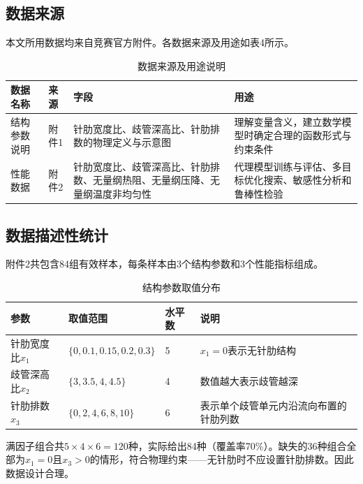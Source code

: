 \documentclass[12pt,a4paper]{ctexart}
\begin{document}
\subsection{数据来源}

本文所用数据均来自竞赛官方附件。各数据来源及用途如表4所示。

\begin{table}[H]
\centering
\caption{数据来源及用途说明}
\footnotesize
\begin{tabular}{p{}p{}p{}p{}}
\toprule
数据名称 & 来源 & 字段 & 用途 \\
\midrule
结构参数说明 & 附件1 & 针肋宽度比、歧管深高比、针肋排数的物理定义与示意图 & 理解变量含义，建立数学模型时确定合理的函数形式与约束条件 \\
\addlinespace
性能数据 & 附件2 & 针肋宽度比、歧管深高比、针肋排数、无量纲热阻、无量纲压降、无量纲温度非均匀性 & 代理模型训练与评估、多目标优化搜索、敏感性分析和鲁棒性检验 \\
\bottomrule
\end{tabular}
\end{table}

\subsection{数据描述性统计}

附件2共包含84组有效样本，每条样本由3个结构参数和3个性能指标组成。

\begin{table}[H]
\centering
\caption{结构参数取值分布}
\footnotesize
\begin{tabular}{p{}p{}p{}p{}}
\toprule
参数 & 取值范围 & 水平数 & 说明 \\
\midrule
针肋宽度比$x_1$ & $\{0,0.1,0.15,0.2,0.3\}$ & 5 & $x_1=0$表示无针肋结构 \\
歧管深高比$x_2$ & $\{3,3.5,4,4.5\}$ & 4 & 数值越大表示歧管越深 \\
针肋排数$x_3$ & $\{0,2,4,6,8,10\}$ & 6 & 表示单个歧管单元内沿流向布置的针肋列数 \\
\bottomrule
\end{tabular}
\end{table}

满因子组合共$5\times4\times6=120$种，实际给出84种（覆盖率70\%）。缺失的36种组合全部为$x_1=0$且$x_3>0$的情形，符合物理约束——无针肋时不应设置针肋排数。因此数据设计合理。
\end{document}
